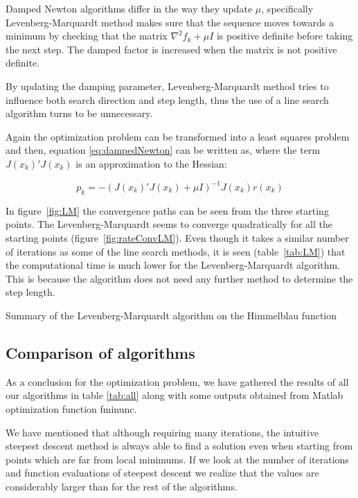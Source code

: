 Damped Newton algorithms differ in the way they update $\mu$, specifically Levenberg-Marquardt method makes sure that the sequence moves towards a minimum by checking that the matrix $\nabla^2 f_k + \mu I$ is positive definite before taking the next step. The damped factor is increased when the matrix is not positive definite. 

By updating the damping parameter, Levenberg-Marquardt method tries to influence both search direction and step length, thus the use of a line search algorithm turns to be unnecessary.

Again the optimization problem can be transformed into a least squares problem and then, equation \ref{eq:dampedNewton} can be written as, where the term $J(x_k)' J(x_k)$ is an approximation to the Hessian:

\begin{equation}
p_k = -(J(x_k)' J(x_k) + \mu I)^{-1} J(x_k) r(x_k)
\label{eq:LM}
\end{equation}

In figure~\ref{fig:LM} the convergence paths can be seen from the three starting points. The Levenberg-Marquardt seems to converge quadratically for all the starting points (figure~\ref{fig:rateConvLM}). Even though it takes a similar number of iterations as some of the line search methods, it is seen (table~\ref{tab:LM}) that the computational time is much lower for the Levenberg-Marquardt algorithm. This is because the algorithm does not need any further method to determine the step length.

\begin{table}[H]
\centering

\caption{Summary of the Levenberg-Marquardt algorithm on the Himmelblau function}
\label{tab:LM}
\end{table}


\subsection{Comparison of algorithms}

As a conclusion for the optimization problem, we have gathered the results of all our algorithms in table \ref{tab:all} along with some outputs obtained from Matlab optimization function fminunc. 

We have mentioned that although requiring many iterations, the intuitive steepest descent method is always able to find a solution even when starting from points which are far from local minimums.  If we look at the number of iterations and function evaluations of steepest descent we realize that the values are considerably larger than for the rest of the algorithms.

